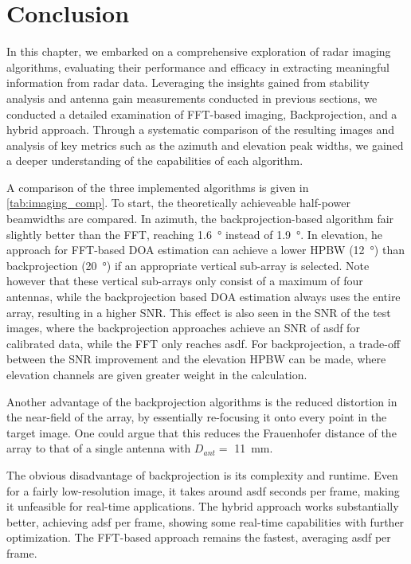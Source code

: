 \section{Conclusion}
In this chapter, we embarked on a comprehensive exploration of radar imaging algorithms, 
evaluating their performance and efficacy in extracting meaningful information from radar data.
Leveraging the insights gained from stability analysis and antenna gain measurements conducted in previous sections,
we conducted a detailed examination of FFT-based imaging, Backprojection, and a hybrid approach.
Through a systematic comparison of the resulting images and analysis of key metrics such as the azimuth and elevation peak widths,
we gained a deeper understanding of the capabilities of each algorithm.

A comparison of the three implemented algorithms is given in \autoref{tab:imaging_comp}.
To start, the theoretically achieveable half-power beamwidths are compared.
In azimuth, the backprojection-based algorithm fair slightly better than the FFT, reaching \SI{1.6}{\degree} instead of \SI{1.9}{\degree}.
In elevation, he approach for FFT-based DOA estimation can achieve a lower HPBW (\SI{12}{\degree}) than backprojection (\SI{20}{\degree})
if an appropriate vertical sub-array is selected.
Note however that these vertical sub-arrays only consist of a maximum of four antennas,
while the backprojection based DOA estimation always uses the entire array, resulting in a higher SNR.
This effect is also seen in the SNR of the test images,
where the backprojection approaches achieve an SNR of asdf for calibrated data, 
while the FFT only reaches asdf.
For backprojection, a trade-off between the SNR improvement and the elevation HPBW can be made, 
where elevation channels are given greater weight in the calculation.

Another advantage of the backprojection algorithms is the reduced distortion in the near-field of the array,
by essentially re-focusing it onto every point in the target image.
One could argue that this reduces the Frauenhofer distance of the array to that of a single antenna with
$D_{ant}=$ \SI{11}{\mm}.

The obvious disadvantage of backprojection is its complexity and runtime.
Even for a fairly low-resolution image, it takes around asdf seconds per frame, making it unfeasible for real-time applications.
The hybrid approach works substantially better, achieving adsf per frame, showing some real-time capabilities with further optimization.
The FFT-based approach remains the fastest, averaging asdf per frame.

